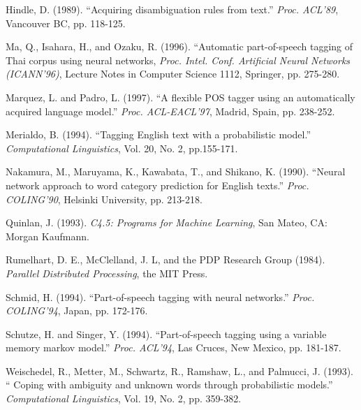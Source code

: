 \begin{thebibliography}{99}
Hindle, D. (1989). ``Acquiring disambiguation rules from text.'' {\it
  Proc. ACL'89}, Vancouver BC, pp. 118-125.

Ma, Q., Isahara, H., and Ozaku, R. (1996). ``Automatic part-of-speech tagging of
Thai corpus using neural networks, {\it Proc. Intel. Conf. Artificial
  Neural Networks (ICANN'96)}, Lecture Notes in Computer Science 1112,
Springer, pp. 275-280.

Marquez, L. and Padro, L. (1997). ``A flexible POS tagger using an automatically
acquired language model.'' {\it Proc. ACL-EACL'97}, Madrid, Spain,
pp. 238-252.

Merialdo, B. (1994). ``Tagging English text with a probabilistic model.''
{\em Computational Linguistics}, Vol. 20, No. 2, pp.155-171.

Nakamura, M., Maruyama, K., Kawabata, T., and Shikano, K. (1990). ``Neural network 
approach to word category prediction for English texts.'' {\it Proc.
  COLING'90}, Helsinki University, pp. 213-218.

Quinlan, J. (1993). {\it C4.5: Programs for Machine Learning}, San Mateo, CA:
Morgan Kaufmann.

Rumelhart, D. E., McClelland, J. L, and the PDP Research Group (1984).
{\it Parallel Distributed Processing}, the MIT Press.

Schmid, H. (1994).  ``Part-of-speech tagging with neural networks.'' {\it Proc.
  COLING'94}, Japan, pp. 172-176.

Schutze, H. and Singer, Y. (1994). ``Part-of-speech tagging using a variable
memory markov model.'' {\it Proc. ACL'94}, Las Cruces, New
Mexico, pp. 181-187.

Weischedel, R., Metter, M., Schwartz, R., Ramshaw, L., and Palmucci, J. (1993). `` Coping with ambiguity and unknown words through
probabilistic models.'' {\it Computational Linguistics}, Vol. 19, No. 2,
pp. 359-382.

\end{thebibliography}

